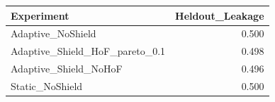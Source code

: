 \begin{tabular}{lr}
\toprule
Experiment & Heldout_Leakage \\
\midrule
Adaptive_NoShield & 0.500 \\
Adaptive_Shield_HoF_pareto_0.1 & 0.498 \\
Adaptive_Shield_NoHoF & 0.496 \\
Static_NoShield & 0.500 \\
\bottomrule
\end{tabular}
